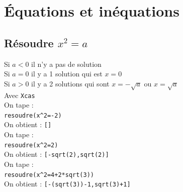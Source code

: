 \documentclass[a4paper,11pt]{book}
\begin{document}
\chapter{\'Equations et in\'equations}
\section{R\'esoudre $x^2=a$}
Si $a<0$ il n'y a pas de solution\\
Si $a=0$ il y a  1 solution qui est $x=0$\\
Si $a>0$ il y a  2 solutions qui sont $x=-\sqrt a$ ou $x=\sqrt a$\\
Avec {\tt Xcas}\\
On tape :\\
{\tt resoudre(x\verb|^|2=-2)}\\
On obtient : {\tt []}\\
On tape :\\
{\tt resoudre(x\verb|^|2=2)}\\
On obtient : {\tt [-sqrt(2),sqrt(2)]}\\
On tape :\\
{\tt resoudre(x\verb|^|2=4+2*sqrt(3))}\\
On obtient : {\tt [-(sqrt(3))-1,sqrt(3)+1]}
\end{document}
